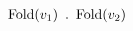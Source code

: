 \documentclass[preview]{standalone}
\begin{document}
\begin{align*}
\text{Fold}(v_1)\hspace{0.5em}.\hspace{0.5em}\text{Fold}(v_2)
\end{align*}
\end{document}
